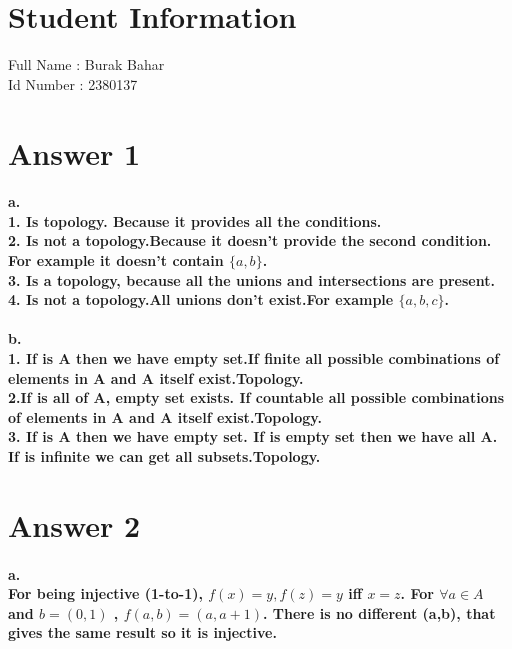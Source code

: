 \documentclass[11pt]{article}
\begin{document}
\section*{Student Information } 
Full Name : Burak Bahar\\
Id Number : 2380137

\section*{Answer 1}
\paragraph{a. \\1. Is topology. Because it provides all the conditions.\\ 2. Is not a topology.Because it doesn't provide the second condition. For example it doesn't contain $\{a,b\}$. \\ 3. Is a topology, because all the unions and intersections are present. \\ 4. Is not a topology.All unions don't exist.For example $\{a, b, c\}$.}
\paragraph{b.\\
1. If is A then we have empty set.If finite all possible combinations of elements in A and A itself exist.Topology.\\
2.If is all of A, empty set exists. If countable all possible combinations of elements in A and A itself exist.Topology.\\
3. If is A then we have empty set. If is empty set then we have all A. If is infinite we can get all subsets.Topology.}

\section*{Answer 2}
\paragraph{a.\\For being injective (1-to-1), $f(x) = y, f(z) = y$ iff $x = z$. For $\forall a \in A$ and $b = (0, 1)$ , $f(a,b)= (a, a+1)$. There is no different (a,b), that gives the same result so it is injective. }
\end{document}

